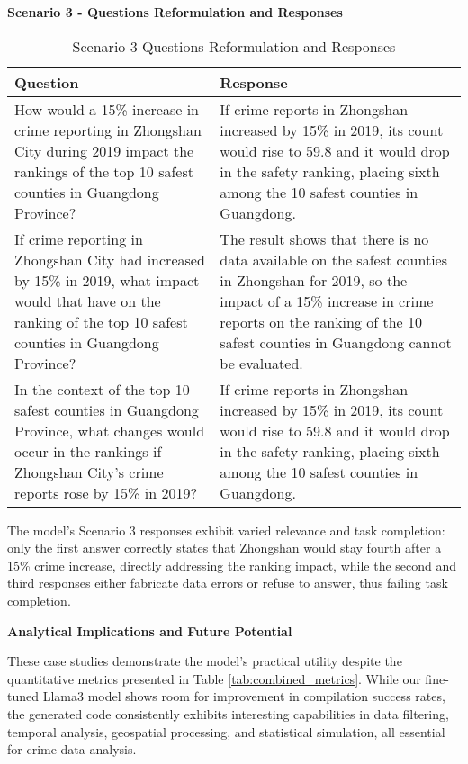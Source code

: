 \noindent \textbf{Scenario 3 - Questions Reformulation and Responses}

\begin{table}[hbtp]
\centering
\small
\begin{tabular}{|p{}|p{}|}
\hline
\textbf{Question} & \textbf{Response} \\
\hline
How would a 15\% increase in crime reporting in Zhongshan City during 2019 impact the rankings of the top 10 safest counties in Guangdong Province? & If crime reports in Zhongshan increased by 15\% in 2019, its count would rise to 59.8 and it would drop in the safety ranking, placing sixth among the 10 safest counties in Guangdong. \\
\hline
If crime reporting in Zhongshan City had increased by 15\% in 2019, what impact would that have on the ranking of the top 10 safest counties in Guangdong Province? & The result shows that there is no data available on the safest counties in Zhongshan for 2019, so the impact of a 15\% increase in crime reports on the ranking of the 10 safest counties in Guangdong cannot be evaluated. \\
\hline
In the context of the top 10 safest counties in Guangdong Province, what changes would occur in the rankings if Zhongshan City's crime reports rose by 15\% in 2019? & If crime reports in Zhongshan increased by 15\% in 2019, its count would rise to 59.8 and it would drop in the safety ranking, placing sixth among the 10 safest counties in Guangdong. \\
\hline
\end{tabular}
\caption{Scenario 3 Questions Reformulation and Responses}
\label{tab:questions_responses_3}
\end{table}

The model's Scenario 3 responses exhibit varied relevance and task completion: only the first answer correctly states that Zhongshan would stay fourth after a 15\% crime increase, directly addressing the ranking impact, while the second and third responses either fabricate data errors or refuse to answer, thus failing task completion.


\noindent \textbf{Analytical Implications and Future Potential}

These case studies demonstrate the model's practical utility despite the quantitative metrics presented in Table \ref{tab:combined_metrics}. While our fine-tuned Llama3 model shows room for improvement in compilation success rates, the generated code consistently exhibits interesting capabilities in data filtering, temporal analysis, geospatial processing, and statistical simulation, all essential for crime data analysis.

